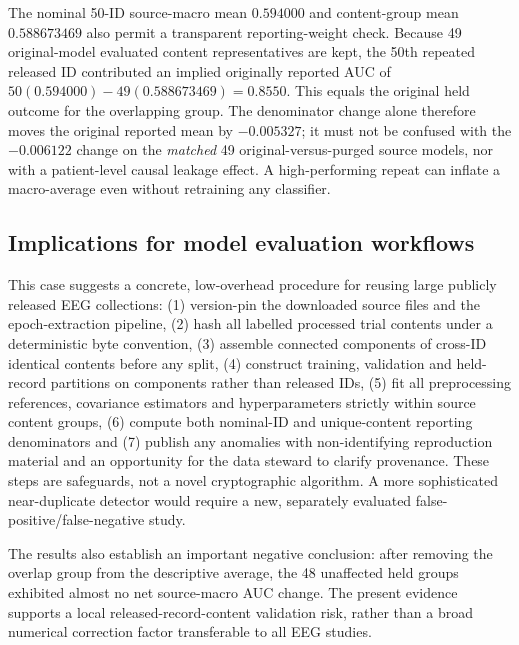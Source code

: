 The nominal 50-ID source-macro mean
$0.594000$ and content-group mean
$0.588673469$ also permit a transparent
reporting-weight check. Because 49
original-model evaluated content representatives
are kept, the 50th repeated released ID
contributed an implied originally reported
AUC of
$50(0.594000)-49(0.588673469)=0.8550$.
This equals the original held outcome for
the overlapping group. The denominator
change alone therefore moves the original
reported mean by $-0.005327$; it must not
be confused with the $-0.006122$ change
on the \emph{matched} 49 original-versus-purged
source models, nor with a patient-level
causal leakage effect. A high-performing
repeat can inflate a macro-average even
without retraining any classifier.

\subsection{Implications for model evaluation workflows}
\label{sec:p2-guidelines}
This case suggests a concrete, low-overhead
procedure for reusing large publicly
released EEG collections:
(1) version-pin the downloaded source files
and the epoch-extraction pipeline,
(2) hash all labelled processed trial contents
under a deterministic byte convention,
(3) assemble connected components of
cross-ID identical contents before any split,
(4) construct training, validation and
held-record partitions on components rather
than released IDs,
(5) fit all preprocessing references,
covariance estimators and hyperparameters
strictly within source content groups,
(6) compute both nominal-ID and unique-content
reporting denominators and
(7) publish any anomalies with non-identifying
reproduction material and an opportunity for
the data steward to clarify provenance.
These steps are safeguards, not a novel
cryptographic algorithm.
A more sophisticated near-duplicate detector
would require a new, separately evaluated
false-positive/false-negative study.

The results also establish an important
negative conclusion: after removing the
overlap group from the descriptive average,
the 48 unaffected held groups exhibited
almost no net source-macro AUC change.
The present evidence supports a local
released-record-content validation risk,
rather than a broad numerical correction
factor transferable to all EEG studies.

